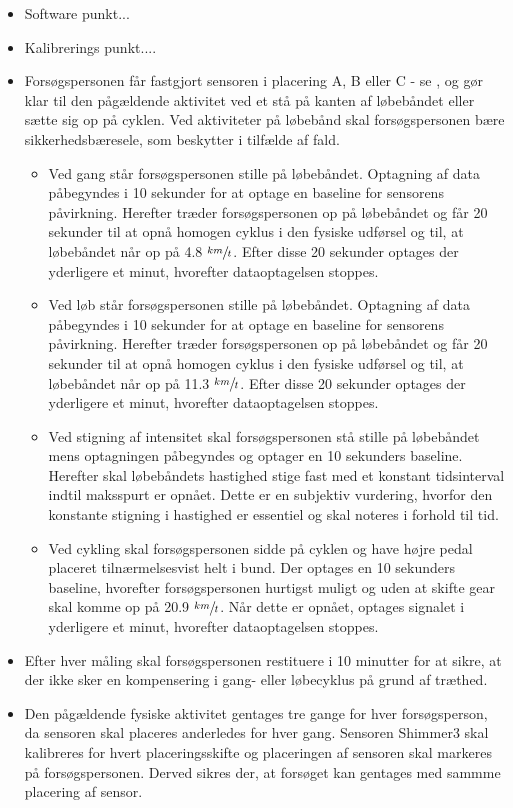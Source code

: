 \begin{itemize}
	\item Software punkt...
	\item Kalibrerings punkt....
	\item Forsøgspersonen får fastgjort sensoren i placering A, B eller C - se , og gør klar til den pågældende aktivitet ved et stå på kanten af løbebåndet eller sætte sig op på cyklen. Ved aktiviteter på løbebånd skal forsøgspersonen bære sikkerhedsbæresele, som beskytter i tilfælde af fald.
	\begin{itemize}
		\item Ved gang står forsøgspersonen stille på løbebåndet. Optagning af data påbegyndes i 10 sekunder for at optage en baseline for sensorens påvirkning. Herefter træder forsøgspersonen op på løbebåndet og får 20 sekunder til at opnå homogen cyklus i den fysiske udførsel og til, at løbebåndet når op på 4.8 $\sfrac{km}{t}$. Efter disse 20 sekunder optages der yderligere et minut, hvorefter dataoptagelsen stoppes.
		\item Ved løb står forsøgspersonen stille på løbebåndet. Optagning af data påbegyndes i 10 sekunder for at optage en baseline for sensorens påvirkning. Herefter træder forsøgspersonen op på løbebåndet og får 20 sekunder til at opnå homogen cyklus i den fysiske udførsel og til, at løbebåndet når op på 11.3 $\sfrac{km}{t}$. Efter disse 20 sekunder optages der yderligere et minut, hvorefter dataoptagelsen stoppes.
		\item Ved stigning af intensitet skal forsøgspersonen stå stille på løbebåndet mens optagningen påbegyndes og optager en 10 sekunders baseline. Herefter skal løbebåndets hastighed stige fast med et konstant tidsinterval indtil maksspurt er opnået. Dette er en subjektiv vurdering, hvorfor den konstante stigning i hastighed er essentiel og skal noteres i forhold til tid.
		\item Ved cykling skal forsøgspersonen sidde på cyklen og have højre pedal placeret tilnærmelsesvist helt i bund. Der optages en 10 sekunders baseline, hvorefter forsøgspersonen hurtigst muligt og uden at skifte gear skal komme op på 20.9 $\sfrac{km}{t}$. Når dette er opnået, optages signalet i yderligere et minut, hvorefter dataoptagelsen stoppes.
	\end{itemize}
	\item Efter hver måling skal forsøgspersonen restituere i 10 minutter for at sikre, at der ikke sker en kompensering i gang- eller løbecyklus på grund af træthed. %
	\item Den pågældende fysiske aktivitet gentages tre gange for hver forsøgsperson, da sensoren skal placeres anderledes for hver gang. Sensoren Shimmer3 skal kalibreres for hvert placeringsskifte og placeringen af sensoren skal markeres på forsøgspersonen. Derved sikres der, at forsøget kan gentages med sammme placering af sensor.
\end{itemize}

